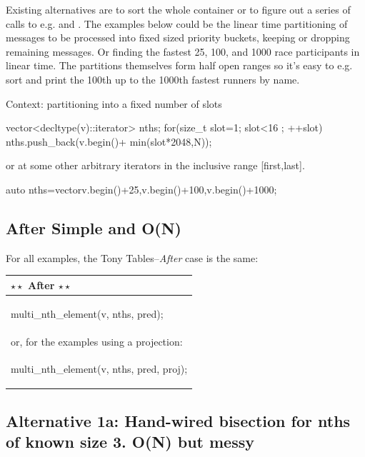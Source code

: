 Existing alternatives are to sort the whole container or to figure out a series of calls to e.g.  and . 
The examples below could be the linear time partitioning of messages to be
processed into fixed sized priority buckets, keeping or dropping remaining messages. Or finding the fastest 25, 100, and 1000 race participants in linear time. 
The partitions themselves form half open ranges so it's easy to e.g. sort and
print the 100th up to the 1000th fastest runners by name. 

Context: partitioning into a fixed number of slots
\begin{codeblock}
vector<decltype(v)::iterator> nths;
for(size_t slot=1; slot<16 ; ++slot){
	nths.push_back(v.begin()+ min(slot*2048,N));
}
\end{codeblock}
or at some other arbitrary iterators in the inclusive range [first,last].
\begin{codeblock}
auto nths=vector{v.begin()+25,v.begin()+100,v.begin()+1000}; 
\end{codeblock}

\subsection*{After \textnormal{ Simple and O(N)}}

For all examples, the Tony Tables--\emph{After} case is the same:\newline

\hspace{3ex}\begin{tabular}{|l|} 
  \hline 
  \textbf{$\star \star$ After $\star \star$} \\
  \hline 
\begin{codeblock} 
multi_nth_element(v, nths, pred);
\end{codeblock}\\[1em]
or, for the examples using a projection:
\\
\begin{codeblock} 
multi_nth_element(v, nths, pred, proj);
\end{codeblock} 
\\
\hline 
\end{tabular} 


\subsection*{Alternative 1a: Hand-wired bisection for nths of known size 3. O(N) but messy}

